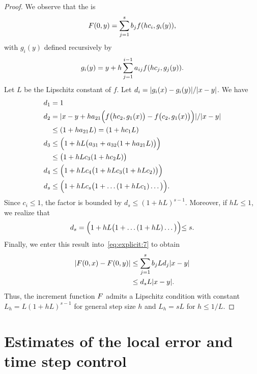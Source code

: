 \begin{proof}
  We observe that the  is
  \begin{gather}
    \label{eq:explicit:7}
    F(0, y) = \sum_{j=1}^s b_j f(hc_i, g_i(y)),
  \end{gather}
  with $g_i(y)$ defined recursively by
  \begin{gather*}
     g_i(y) = y + h \sum_{j=1}^{i-1} a_{ij} f(hc_j, g_j(y)).
  \end{gather*}
  Let $L$ be the Lipschitz constant of $f$. Let
  $d_i = \lvert g_i(x)-g_i(y)\rvert/\lvert x-y\rvert$. We have
  \begin{align*}
    d_1 &= 1
    \\
    d_2 &= \lvert x-y + h a_{21}
          \Bigl(f\bigl(hc_2,g_1(x)\bigr)
          -f\bigl(c_2,g_1(x)\bigr)
          \Bigr)\rvert/\lvert x-y\rvert
    \\ &\le (1+ha_{21}L)
         = (1+hc_{1}L)
    \\
    d_3 & \le \Bigl(1+
          h L\bigl(a_{31}+a_{32}(1+ha_{21}L)\bigr)\Bigr)
    \\ &\le \bigl(1+h L c_3(1+h c_2L)\bigr)
    \\
    d_4 & \le \Bigl(1+
          h L c_4\bigl(1+h L c_3(1+h L c_2)\bigr)\Bigr)
    \\
    d_s & \le
          \Bigl(1+ h L c_s\bigl(
          1+\dots(1+h L c_1)\dots\bigl)\Bigl).
  \end{align*}
  Since $c_i \le 1$, the factor is bounded by
  $d_s\le(1+h L)^{s-1}$. Moreover, if $h L \le 1$, we realize that
  \begin{gather*}
    d_s = \Bigl(1+ h L \bigl(1+\dots(1+h L)\dots\bigl)\Bigl) \le s.
  \end{gather*}
  Finally, we enter this result into~\eqref{eq:explicit:7} to obtain
  \begin{align*}
    \lvert F(0,x)-F(0,y)\rvert
    & \le \sum_{j=1}^s b_j L d_j \lvert x-y\rvert
    \\
    & \le d_s L \lvert x-y\rvert.
  \end{align*}
  Thus, the increment function $F$ admits a Lipschitz
  condition with constant $L_h = L(1+h L)^{s-1}$ for general step size
  $h$ and $L_h = s L$ for $h\le 1/L$.
\end{proof}

\section{Estimates of the local error
  and time step control}
  \label{section:step_size_control}


